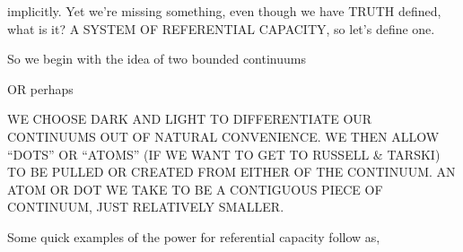 \documentclass[12pt]{article}
\begin{document}
implicitly. Yet we're missing something, even though we have TRUTH defined,
what is it? A SYSTEM OF REFERENTIAL CAPACITY, so let's define one.

\newpage

So we begin with the idea of two bounded continuums

\begin{center}
\end{center}
OR perhaps
\begin{center}
\end{center}

WE CHOOSE DARK AND LIGHT TO DIFFERENTIATE OUR CONTINUUMS OUT OF NATURAL
CONVENIENCE. WE THEN ALLOW ``DOTS'' OR ``ATOMS'' (IF WE WANT TO GET TO
RUSSELL \& TARSKI) TO BE PULLED OR CREATED FROM EITHER OF THE CONTINUUM.
AN ATOM OR DOT WE TAKE TO BE A CONTIGUOUS PIECE OF CONTINUUM, JUST RELATIVELY
SMALLER.

Some quick examples of the power for referential capacity follow as,
\end{document}
